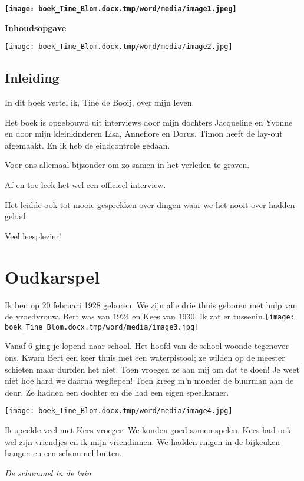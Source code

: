 \documentclass{scrbook}
\begin{document}
\textbf{\texttt{[image: boek\_Tine\_Blom.docx.tmp/word/media/image1.jpeg]}}

\textbf{Inhoudsopgave}

\tableofcontents

\texttt{[image: boek\_Tine\_Blom.docx.tmp/word/media/image2.jpg]}

\section{Inleiding}

In dit boek vertel ik, Tine de Booij, over mijn leven.

Het boek is opgebouwd uit interviews door mijn dochters Jacqueline en Yvonne en door mijn kleinkinderen Lisa, Anneflore en Dorus. Timon heeft de lay-out afgemaakt. En ik heb de eindcontrole gedaan.

Voor ons allemaal bijzonder om zo samen in het verleden te graven.

Af en toe leek het wel een officieel interview.

Het leidde ook tot mooie gesprekken over dingen waar we het nooit over hadden gehad.

Veel leesplezier!

\chapter{\label{ref-002}Oudkarspel}

Ik ben op 20 februari 1928 geboren. We zijn alle drie thuis geboren met hulp van de vroedvrouw. Bert was van 1924 en Kees van 1930. Ik zat er tussenin.\texttt{[image: boek\_Tine\_Blom.docx.tmp/word/media/image3.jpg]}

Vanaf 6 ging je lopend naar school. Het hoofd van de school woonde tegenover ons. Kwam Bert een keer thuis met een waterpistool; ze wilden op de meester schieten maar durfden het niet. Toen vroegen ze aan mij om dat te doen! Je weet niet hoe hard we daarna wegliepen! Toen kreeg m’n moeder de buurman aan de deur. Ze hadden een dochter en die had een eigen speelkamer.

\texttt{[image: boek\_Tine\_Blom.docx.tmp/word/media/image4.jpg]}

Ik speelde veel met Kees vroeger. We konden goed samen spelen. Kees had ook wel zijn vriendjes en ik mijn vriendinnen. We hadden ringen in de bijkeuken hangen en een schommel buiten.

\textit{De schommel in de tuin}
\end{document}
